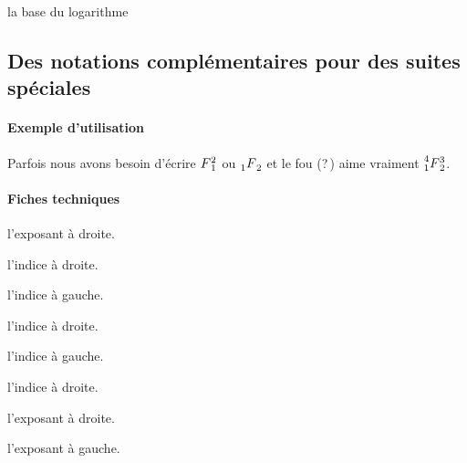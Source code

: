 \documentclass[12pt,a4paper]{article}
\theoremstyle{definition}
\begin{document}

\IDarg{} la base du logarithme






\subsection{Des notations complémentaires pour des suites spéciales}

\paragraph{Exemple d'utilisation}

\begin{tcblisting}{}
Parfois nous avons besoin d'écrire $\seqplus{F}{1}{2}$ ou $\seqhypergeo{F}{1}{2}$ et
le fou (?\,) aime vraiment $\seqsuprageo{F}{1}{2}{3}{4}$.
\end{tcblisting}


\paragraph{Fiches techniques}


 l'exposant à droite.

 l'indice à droite.


\bigskip



 l'indice à gauche.

 l'indice à droite.


\bigskip



 l'indice à gauche.

 l'indice à droite.

 l'exposant à droite.

 l'exposant à gauche.




\end{document}
